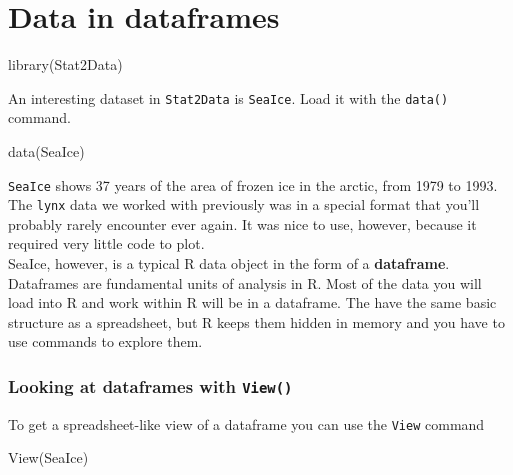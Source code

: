 \documentclass[
]{book}
\newenvironment{Shaded}{\begin{snugshade}}{\end{snugshade}}
\newcommand{\FunctionTok}[1]{\textcolor[rgb]{0.00,0.00,0.00}{#1}}
\newcommand{\NormalTok}[1]{#1}
\begin{document}
\hypertarget{data-in-dataframes}{%
\chapter{Data in dataframes}\label{data-in-dataframes}}

\begin{Shaded}
\begin{Highlighting}[]
\FunctionTok{library}\NormalTok{(Stat2Data)}
\end{Highlighting}
\end{Shaded}

An interesting dataset in \texttt{Stat2Data} is \texttt{SeaIce}. Load it with the \texttt{data()} command.

\begin{Shaded}
\begin{Highlighting}[]
\FunctionTok{data}\NormalTok{(SeaIce)}
\end{Highlighting}
\end{Shaded}

\texttt{SeaIce} shows 37 years of the area of frozen ice in the arctic, from 1979 to 1993. The \texttt{lynx} data we worked with previously was in a special format that you'll probably rarely encounter ever again. It was nice to use, however, because it required very little code to plot.\\
SeaIce, however, is a typical R data object in the form of a \textbf{dataframe}. Dataframes are fundamental units of analysis in R. Most of the data you will load into R and work within R will be in a dataframe. The have the same basic structure as a spreadsheet, but R keeps them hidden in memory and you have to use commands to explore them.

\hypertarget{looking-at-dataframes-with-view}{%
\subsection{\texorpdfstring{Looking at dataframes with \texttt{View()}}{Looking at dataframes with View()}}\label{looking-at-dataframes-with-view}}

To get a spreadsheet-like view of a dataframe you can use the \texttt{View} command

\begin{Shaded}
\begin{Highlighting}[]
\FunctionTok{View}\NormalTok{(SeaIce)}
\end{Highlighting}
\end{Shaded}
\end{document}
